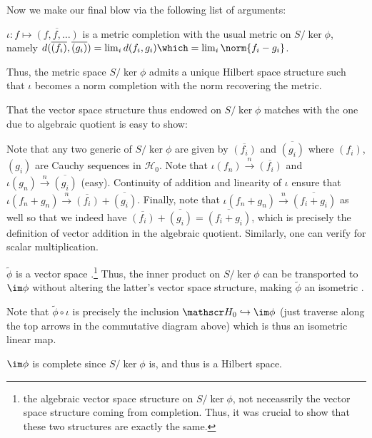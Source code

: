 	Now we make our final blow via the following list of arguments:
	\begin{mylist}
		\item $\iota\colon f\mapsto \overline{(f, f, \ldots)}$ is a metric completion with the usual metric on $S/\ker\phi$, namely $d(\overline{(f_i)}, \overline{(g_i)}) = \lim_i d(f_i, g_i)\which = \lim_i\norm{f_i - g_i}$.
		
		\item Thus, the metric space $S/\ker\phi$ admits a unique Hilbert space structure such that $\iota$ becomes a norm completion with the norm recovering the metric.
		
		\item That the vector space structure thus endowed on $S/\ker\phi$ matches with the one due to algebraic quotient is easy to show:
		\begin{subproof}
			Note that any two generic  of $S/\ker\phi$ are given by $\overline{(f_i)}$ and $\overline{(g_i)}$ where $(f_i)$, $(g_i)$ are Cauchy sequences in $\mathscr H_0$. Note that $\iota(f_n)\stackrel{n}{\to} \overline{(f_i)}$ and $\iota(g_n)\stackrel{n}{\to}\overline{(g_i)}$ (easy). Continuity of addition and linearity of $\iota$ ensure that $\iota(f_n + g_n)\stackrel{n}{\to} \overline{(f_i)} + \overline{(g_i)}$. Finally, note that $\iota(f_n + g_n)\stackrel{n}{\to}\overline{(f_i + g_i)}$ as well so that we indeed have $\overline{(f_i)} + \overline{(g_i)} = \overline{(f_i + g_i)}$, which is precisely the definition of vector addition in the algebraic quotient. Similarly, one can verify for scalar multiplication.
		\end{subproof}
		
		\item $\tilde\phi$ is a vector space \iso.\footnote{
			\Wrt the algebraic vector space structure on $S/\ker\phi$, not neceassrily the vector space structure coming from completion. Thus, it was crucial to show that these two structures are exactly the same.
		} Thus, the inner product on $S/\ker\phi$ can be transported to $\im\phi$ without altering the latter's vector space structure, making $\tilde\phi$ an isometric \iso.
		
		\item Note that $\tilde\phi\circ\iota$ is precisely the inclusion $\mathscr H_0\hookrightarrow\im\phi$ (just traverse along the top arrows in the commutative diagram above) which is thus an isometric linear map.
		
		\item $\im\phi$ is complete since $S/\ker\phi$ is, and thus is a Hilbert space.
		

\end{mylist}
